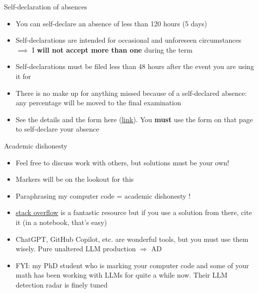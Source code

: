 \documentclass[aspectratio=169]{beamer}\usepackage[]{graphicx}\usepackage[]{xcolor}
\begin{document}
\begin{frame}{Self-declaration of absences}
\begin{itemize}
\item You can self-declare an absence of less than 120 hours (5 days)
\vfill
\item Self-declarations are intended for occasional and unforeseen circumstances $\implies$ I \textbf{will not accept more than one} during the term
\vfill
\item Self-declarations must be filed less than 48 hours after the event you are using it for
\vfill
\item There is no make up for anything missed because of a self-declared absence: any percentage will be moved to the final examination
\vfill
\item See the details and the form here (\href{https://umanitoba.ca/student-supports/academic-supports/student-advocacy/self-declaration-policy-students}{link}). You \textbf{must} use the form on that page to self-declare your absence
\end{itemize}
\end{frame}

\begin{frame}{Academic dishonesty}
\begin{itemize}
\item Feel free to discuss work with others, but solutions must be your own!
\vfill
\item Markers will be on the lookout for this
\vfill
\item Paraphrasing my computer code = academic dishonesty !
\vfill
\item \href{https://stackoverflow.com/}{stack overflow} is a fantastic resource but if you use a solution from there, cite it (in a notebook, that's easy)
\vfill
\item ChatGPT, GitHub Copilot, etc. are wonderful tools, but you must use them wisely. Pure unaltered LLM production $\Rightarrow$ AD
\vfill
\item FYI: my PhD student who is marking your computer code and some of your math has been working with LLMs for quite a while now. Their LLM detection radar is finely tuned
\end{itemize}
\end{frame}

\end{document}
